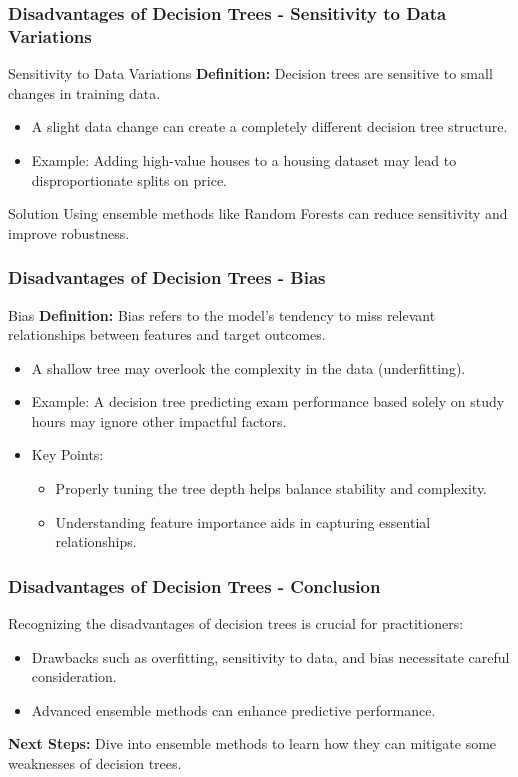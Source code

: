 \documentclass[aspectratio=169]{beamer}
\begin{document}
\begin{frame}[fragile]
    \frametitle{Disadvantages of Decision Trees - Sensitivity to Data Variations}
    \begin{block}{Sensitivity to Data Variations}
        \textbf{Definition:} Decision trees are sensitive to small changes in training data.
    \end{block}
    \begin{itemize}
        \item A slight data change can create a completely different decision tree structure.
        \item Example: Adding high-value houses to a housing dataset may lead to disproportionate splits on price.
    \end{itemize}
    \begin{block}{Solution}
        Using ensemble methods like Random Forests can reduce sensitivity and improve robustness.
    \end{block}
\end{frame}

\begin{frame}[fragile]
    \frametitle{Disadvantages of Decision Trees - Bias}
    \begin{block}{Bias}
        \textbf{Definition:} Bias refers to the model's tendency to miss relevant relationships between features and target outcomes.
    \end{block}
    \begin{itemize}
        \item A shallow tree may overlook the complexity in the data (underfitting).
        \item Example: A decision tree predicting exam performance based solely on study hours may ignore other impactful factors.
        \item Key Points:
        \begin{itemize}
            \item Properly tuning the tree depth helps balance stability and complexity.
            \item Understanding feature importance aids in capturing essential relationships.
        \end{itemize}
    \end{itemize}
\end{frame}

\begin{frame}[fragile]
    \frametitle{Disadvantages of Decision Trees - Conclusion}
    Recognizing the disadvantages of decision trees is crucial for practitioners:
    \begin{itemize}
        \item Drawbacks such as overfitting, sensitivity to data, and bias necessitate careful consideration.
        \item Advanced ensemble methods can enhance predictive performance.
    \end{itemize}
    \textbf{Next Steps:} Dive into ensemble methods to learn how they can mitigate some weaknesses of decision trees.
\end{frame}
\end{document}

